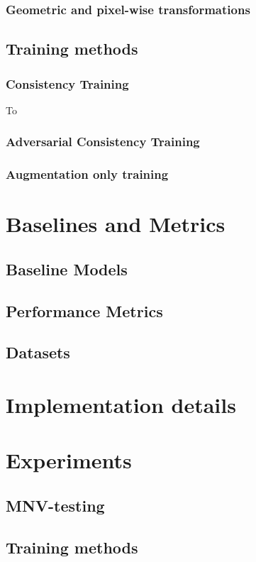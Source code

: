     \subsubsection{Geometric and pixel-wise transformations}
    \subsection{Training methods}
        \subsubsection{Consistency Training}
            To 
        \subsubsection{Adversarial Consistency Training}
        \subsubsection{Augmentation only training}
\section{Baselines and Metrics}
    \subsection{Baseline Models}
    \subsection{Performance Metrics}
    \subsection{Datasets}
\section{Implementation details}
\section{Experiments}
    \subsection{MNV-testing}
	\subsection{Training methods}
